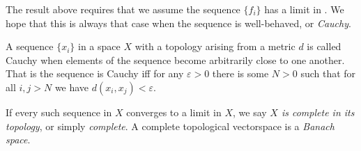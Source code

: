       The result above requires that we assume the sequence $\{f_i\}$ has a limit in \Coo.
      We hope that this is always that case when the sequence is well-behaved, or \emph{Cauchy}.
      \begin{defn}
        A sequence $\{x_i\}$ in a space $X$ with a topology arising from a metric $d$ is called Cauchy when elements of the sequence become arbitrarily close to one another.
        That is the sequence is Cauchy iff for any $\varepsilon>0$ there is some $N>0$ such that for all $i,j>N$ we have $d(x_i,x_j)<\varepsilon$.

        If every such sequence in $X$ converges to a limit in $X$, we say \emph{$X$ is complete in its topology}, or simply \emph{complete}.
        A complete topological vectorspace is a \emph{Banach space}.
      \end{defn}

